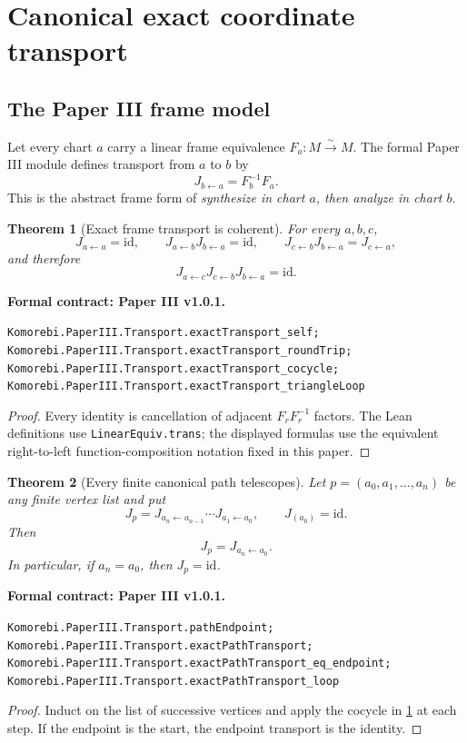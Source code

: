 \documentclass[11pt,a4paper]{article}
\newtheorem{theorem}{Theorem}[section]
\theoremstyle{plain}
\theoremstyle{definition}
\theoremstyle{remark}
\newcommand{\id}{\mathrm{id}}
\newcommand{\leanname}[1]{\nolinkurl{#1}}
\newcommand{\statusleanthree}[1]{\par\smallskip\noindent\begin{minipage}{\linewidth}{\color{leanblue}\textbf{Formal contract: Paper III v1.0.1.}}\par\begingroup\small\raggedright\leanname{#1}\par\endgroup\end{minipage}\par\smallskip}
\begin{document}
\section{Canonical exact coordinate transport}
\label{sec:canonical-transport}

\subsection{The Paper III frame model}

Let every chart $a$ carry a linear frame equivalence
$F_a:M\xrightarrow{\sim}M$.  The formal Paper III module defines transport
from $a$ to $b$ by
\[
J_{b\leftarrow a}=F_b^{-1}F_a.
\]
This is the abstract frame form of \emph{synthesize in chart \(a\), then
analyze in chart \(b\)}.

\begin{theorem}[Exact frame transport is coherent]
\label{thm:exact-frame-transport}
For every $a,b,c$,
\[
J_{a\leftarrow a}=\id,\qquad
J_{a\leftarrow b}J_{b\leftarrow a}=\id,\qquad
J_{c\leftarrow b}J_{b\leftarrow a}=J_{c\leftarrow a},
\]
and therefore
\[
J_{a\leftarrow c}J_{c\leftarrow b}J_{b\leftarrow a}=\id.
\]
\end{theorem}
\statusleanthree{Komorebi.PaperIII.Transport.exactTransport_self; Komorebi.PaperIII.Transport.exactTransport_roundTrip; Komorebi.PaperIII.Transport.exactTransport_cocycle; Komorebi.PaperIII.Transport.exactTransport_triangleLoop}

\begin{proof}
Every identity is cancellation of adjacent $F_rF_r^{-1}$ factors.  The Lean
definitions use \leanname{LinearEquiv.trans}; the displayed formulas use the
equivalent right-to-left function-composition notation fixed in this paper.
\end{proof}

\begin{theorem}[Every finite canonical path telescopes]
\label{thm:exact-path-transport}
Let $p=(a_0,a_1,\ldots,a_n)$ be any finite vertex list and put
\[
J_p
=J_{a_n\leftarrow a_{n-1}}\cdots J_{a_1\leftarrow a_0},
\qquad
J_{(a_0)}=\id.
\]
Then
\[
J_p=J_{a_n\leftarrow a_0}.
\]
In particular, if $a_n=a_0$, then $J_p=\id$.
\end{theorem}
\statusleanthree{Komorebi.PaperIII.Transport.pathEndpoint; Komorebi.PaperIII.Transport.exactPathTransport; Komorebi.PaperIII.Transport.exactPathTransport_eq_endpoint; Komorebi.PaperIII.Transport.exactPathTransport_loop}

\begin{proof}
Induct on the list of successive vertices and apply the cocycle in
\cref{thm:exact-frame-transport} at each step.  If the endpoint is the start,
the endpoint transport is the identity.
\end{proof}
\end{document}
